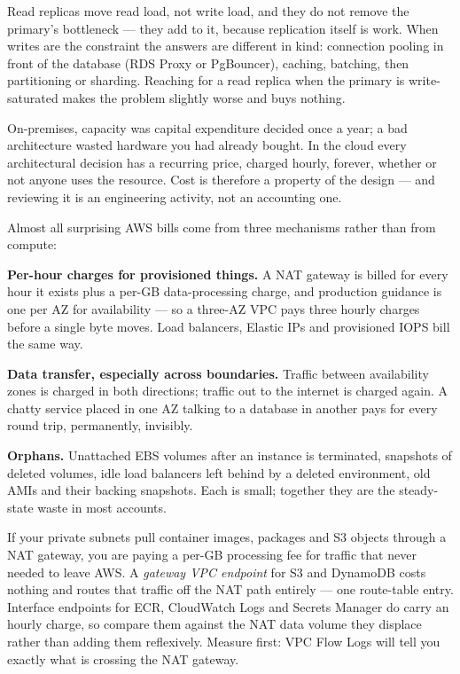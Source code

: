 \begin{scalenote}
Read replicas move read load, not write load, and they do not remove the primary's bottleneck --- they add to it, because replication itself is work. When writes are the constraint the answers are different in kind: connection pooling in front of the database (RDS Proxy or PgBouncer), caching, batching, then partitioning or sharding. Reaching for a read replica when the primary is write-saturated makes the problem slightly worse and buys nothing.
\end{scalenote}


 On-premises, capacity was capital expenditure decided once a year; a bad architecture wasted hardware you had already bought. In the cloud every architectural decision has a recurring price, charged hourly, forever, whether or not anyone uses the resource. Cost is therefore a property of the design --- and reviewing it is an engineering activity, not an accounting one.

 Almost all surprising AWS bills come from three mechanisms rather than from compute:

\begin{wbitem}
  \item \textbf{Per-hour charges for provisioned things.} A NAT gateway is billed for every hour it exists plus a per-GB data-processing charge, and production guidance is one per AZ for availability --- so a three-AZ VPC pays three hourly charges before a single byte moves. Load balancers, Elastic IPs and provisioned IOPS bill the same way.
  \item \textbf{Data transfer, especially across boundaries.} Traffic between availability zones is charged in both directions; traffic out to the internet is charged again. A chatty service placed in one AZ talking to a database in another pays for every round trip, permanently, invisibly.
  \item \textbf{Orphans.} Unattached EBS volumes after an instance is terminated, snapshots of deleted volumes, idle load balancers left behind by a deleted environment, old AMIs and their backing snapshots. Each is small; together they are the steady-state waste in most accounts.
\end{wbitem}

\begin{costnote}
If your private subnets pull container images, packages and S3 objects through a NAT gateway, you are paying a per-GB processing fee for traffic that never needed to leave AWS. A \emph{gateway VPC endpoint} for S3 and DynamoDB costs nothing and routes that traffic off the NAT path entirely --- one route-table entry. Interface endpoints for ECR, CloudWatch Logs and Secrets Manager do carry an hourly charge, so compare them against the NAT data volume they displace rather than adding them reflexively. Measure first: VPC Flow Logs will tell you exactly what is crossing the NAT gateway.
\end{costnote}

